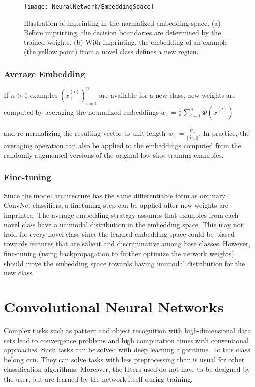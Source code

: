 \begin{figure}[!h]
	\label{fig: EmbSpace}
	\centering
	\texttt{[image: NeuralNetwork/EmbeddingSpace]}
	\caption{Illustration of imprinting in the normalized embedding
		space. (a) Before imprinting, the decision boundaries are determined by the trained weights. (b) With imprinting, the embedding
		of an example (the yellow point) from a novel class defines a new
		region. \cite{Qi:2018}}
\end{figure}

\subsubsection{Average Embedding}
 If $n > 1$ examples $(x_{+}^{(i)})_{i=1}^{n}$ are
available for a new class, new weights are computed by averaging the normalized embeddings $\tilde{w}_{x} = \frac{1}{n}\sum_{i=1}^{n}\Phi(x_{+}^{(i)})$

and re-normalizing the resulting vector to unit length $w_{+} =
\frac{\tilde{w}_{+}}{||\tilde{w}_{+}||}$. In practice, the averaging operation can also
be applied to the embeddings computed from the randomly
augmented versions of the original low-shot training examples.

\subsubsection{Fine-tuning} 
Since the model architecture has the same
differentiable form as ordinary ConvNet classifiers, a finetuning step can be applied after new weights are imprinted.
The average embedding strategy assumes that examples
from each novel class have a unimodal distribution in the
embedding space. This may not hold for every novel class
since the learned embedding space could be biased towards features that are salient and discriminative among
base classes. However, fine-tuning (using backpropagation
to further optimize the network weights) should move the
embedding space towards having unimodal distribution for
the new class. \cite{Qi:2018}



\section{Convolutional Neural Networks}

Complex tasks such as pattern and object recognition with high-dimensional data sets lead to convergence problems and high computation times with conventional approaches. Such tasks can be solved with deep learning algorithms. To this class belong \ac{cnn}. They can solve tasks with less preprocessing than is usual for other classification algorithms. Moreover, the filters used do not have to be designed by the user, but are learned by the network itself during training. \cite{Saha:2018}

